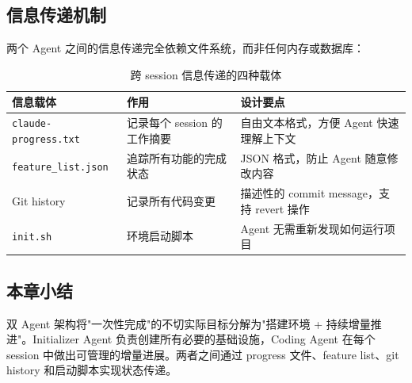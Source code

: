 \subsection{信息传递机制}

两个 Agent 之间的信息传递完全依赖文件系统，而非任何内存或数据库：

\begin{table}[H]
\centering
\begin{tabular}{p{4cm}p{4cm}p{5cm}}
\toprule
\textbf{信息载体} & \textbf{作用} & \textbf{设计要点} \\
\midrule
\texttt{claude-progress.txt} & 记录每个 session 的工作摘要 & 自由文本格式，方便 Agent 快速理解上下文 \\
\midrule
\texttt{feature\_list.json} & 追踪所有功能的完成状态 & JSON 格式，防止 Agent 随意修改内容 \\
\midrule
Git history & 记录所有代码变更 & 描述性的 commit message，支持 revert 操作 \\
\midrule
\texttt{init.sh} & 环境启动脚本 & Agent 无需重新发现如何运行项目 \\
\bottomrule
\end{tabular}
\caption{跨 session 信息传递的四种载体}
\end{table}

\subsection{本章小结}

双 Agent 架构将"一次性完成"的不切实际目标分解为"搭建环境 + 持续增量推进"。Initializer Agent 负责创建所有必要的基础设施，Coding Agent 在每个 session 中做出可管理的增量进展。两者之间通过 progress 文件、feature list、git history 和启动脚本实现状态传递。


